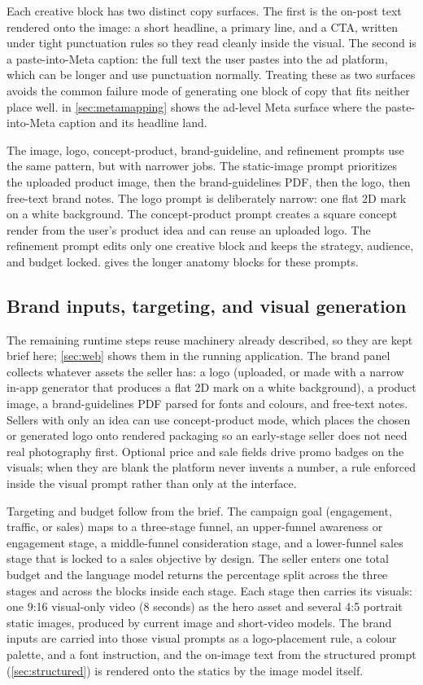 \documentclass[12pt,a4paper]{report}
\begin{document}
Each creative block has two distinct copy surfaces. The first is the on-post text rendered onto the image: a short headline, a primary line, and a CTA, written under tight punctuation rules so they read cleanly inside the visual. The second is a paste-into-Meta caption: the full text the user pastes into the ad platform, which can be longer and use punctuation normally. Treating these as two surfaces avoids the common failure mode of generating one block of copy that fits neither place well.  in \cref{sec:metamapping} shows the ad-level Meta surface where the paste-into-Meta caption and its headline land.

The image, logo, concept-product, brand-guideline, and refinement prompts use the same pattern, but with narrower jobs. The static-image prompt prioritizes the uploaded product image, then the brand-guidelines PDF, then the logo, then free-text brand notes. The logo prompt is deliberately narrow: one flat 2D mark on a white background. The concept-product prompt creates a square concept render from the user's product idea and can reuse an uploaded logo. The refinement prompt edits only one creative block and keeps the strategy, audience, and budget locked.  gives the longer anatomy blocks for these prompts.

\subsection{Brand inputs, targeting, and visual generation}
\label{sec:brand}

The remaining runtime steps reuse machinery already described, so they are kept brief here; \cref{sec:web} shows them in the running application. The brand panel collects whatever assets the seller has: a logo (uploaded, or made with a narrow in-app generator that produces a flat 2D mark on a white background), a product image, a brand-guidelines PDF parsed for fonts and colours, and free-text notes. Sellers with only an idea can use concept-product mode\label{sec:concept}, which places the chosen or generated logo onto rendered packaging so an early-stage seller does not need real photography first. Optional price and sale fields drive promo badges on the visuals; when they are blank the platform never invents a number, a rule enforced inside the visual prompt rather than only at the interface.

Targeting and budget follow from the brief. The campaign goal (engagement, traffic, or sales) maps to a three-stage funnel, an upper-funnel awareness or engagement stage, a middle-funnel consideration stage, and a lower-funnel sales stage that is locked to a sales objective by design. The seller enters one total budget and the language model returns the percentage split across the three stages and across the blocks inside each stage. Each stage then carries its visuals: one 9:16 visual-only video (8 seconds) as the hero asset and several 4:5 portrait static images, produced by current image and short-video models. The brand inputs are carried into those visual prompts as a logo-placement rule, a colour palette, and a font instruction, and the on-image text from the structured prompt (\cref{sec:structured}) is rendered onto the statics by the image model itself.
\end{document}
